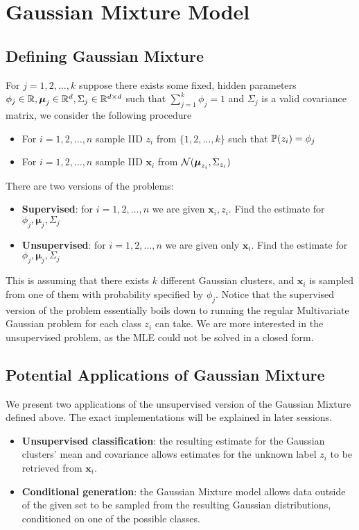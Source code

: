\section{Gaussian Mixture Model}
\subsection{Defining Gaussian Mixture}
\begin{definition}
    For $j=1,2,\dots,k$ suppose there exists some fixed, hidden parameters $\phi_j \in \mathbb{R},\boldsymbol{\mu}_j \in \mathbb{R}^d,\Sigma_j \in \mathbb{R}^{d\times d}$ such that $\sum_{j=1}^k \phi_j = 1$ and $\Sigma_j$ is a valid covariance matrix, we consider the following procedure
    \begin{itemize}
        \item For $i=1,2,\dots,n$ sample IID $z_i$ from $\{1,2,\dots,k\}$ such that $\mathbb{P}(z_i)=\phi_j$
        \item For $i=1,2,\dots,n$ sample IID $\textbf{x}_i$ from $\mathcal{N}(\boldsymbol{\mu}_{z_i},\Sigma_{z_i})$
    \end{itemize}
    There are two versions of the problems:
    \begin{itemize}
        \item \textbf{Supervised}: for $i=1,2,\dots,n$ we are given $\textbf{x}_i,z_i$. Find the estimate for $\phi_j,\boldsymbol{\mu}_j,\Sigma_j$
        \item \textbf{Unsupervised}: for $i=1,2,\dots,n$ we are given only $\textbf{x}_i$. Find the estimate for $\phi_j,\boldsymbol{\mu}_j,\Sigma_j$
    \end{itemize}
\end{definition}
This is assuming that there exists $k$ different Gaussian clusters, and $\mathbf{x}_i$ is sampled from one of them with probability specified by $\phi_j$. Notice that the supervised version of the problem essentially boils down to running the regular Multivariate Gaussian problem for each class $z_i$ can take. We are more interested in the unsupervised problem, as the MLE could not be solved in a closed form.
\subsection{Potential Applications of Gaussian Mixture}
We present two applications of the unsupervised version of the Gaussian Mixture defined above. The exact implementations will be explained in later sessions.
\begin{itemize}
    \item \textbf{Unsupervised classification}: the resulting estimate for the Gaussian clusters' mean and covariance allows estimates for the unknown label $z_i$ to be retrieved from $\textbf{x}_i$.
    \item \textbf{Conditional generation}: the Gaussian Mixture model allows data outside of the given set to be sampled from the resulting Gaussian distributions, conditioned on one of the possible classes.
\end{itemize}
